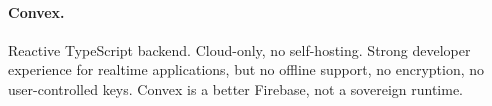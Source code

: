 \paragraph{Convex.} Reactive TypeScript backend. Cloud-only, no self-hosting.
Strong developer experience for realtime applications, but no offline support,
no encryption, no user-controlled keys. Convex is a better Firebase, not a
sovereign runtime.

